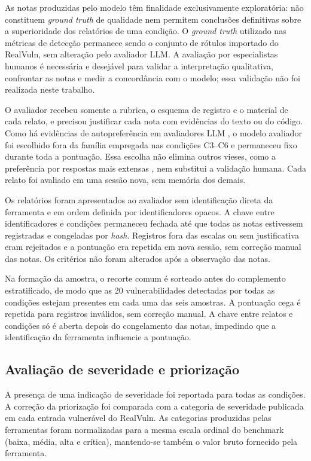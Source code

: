 As notas produzidas pelo modelo têm finalidade exclusivamente exploratória: não constituem \textit{ground truth} de qualidade nem permitem conclusões definitivas sobre a superioridade dos relatórios de uma condição. O \textit{ground truth} utilizado nas métricas de detecção permanece sendo o conjunto de rótulos importado do RealVuln, sem alteração pelo avaliador LLM. A avaliação por especialistas humanos é necessária e desejável para validar a interpretação qualitativa, confrontar as notas e medir a concordância com o modelo; essa validação não foi realizada neste trabalho.

O avaliador recebeu somente a rubrica, o esquema de registro e o material de cada relato, e precisou justificar cada nota com evidências do texto ou do código. Como há evidências de autopreferência em avaliadores LLM \cite{Panickssery2024SelfPreference}, o modelo avaliador foi escolhido fora da família empregada nas condições C3--C6 e permaneceu fixo durante toda a pontuação. Essa escolha não elimina outros vieses, como a preferência por respostas mais extensas \cite{Zheng2023LLMJudge}, nem substitui a validação humana. Cada relato foi avaliado em uma sessão nova, sem memória dos demais.

Os relatórios foram apresentados ao avaliador sem identificação direta da ferramenta e em ordem definida por identificadores opacos. A chave entre identificadores e condições permaneceu fechada até que todas as notas estivessem registradas e congeladas por \textit{hash}. Registros fora das escalas ou sem justificativa eram rejeitados e a pontuação era repetida em nova sessão, sem correção manual das notas. Os critérios não foram alterados após a observação das notas.

Na formação da amostra, o recorte comum é sorteado antes do complemento estratificado, de modo que as 20 vulnerabilidades detectadas por todas as condições estejam presentes em cada uma das seis amostras. A pontuação cega é repetida para registros inválidos, sem correção manual. A chave entre relatos e condições só é aberta depois do congelamento das notas, impedindo que a identificação da ferramenta influencie a pontuação.

\subsection{Avaliação de severidade e priorização}\label{subsec:priorizacao-metodologia}

A presença de uma indicação de severidade foi reportada para todas as condições. A correção da priorização foi comparada com a categoria de severidade publicada em cada entrada vulnerável do RealVuln. As categorias produzidas pelas ferramentas foram normalizadas para a mesma escala ordinal do benchmark (baixa, média, alta e crítica), mantendo-se também o valor bruto fornecido pela ferramenta.

